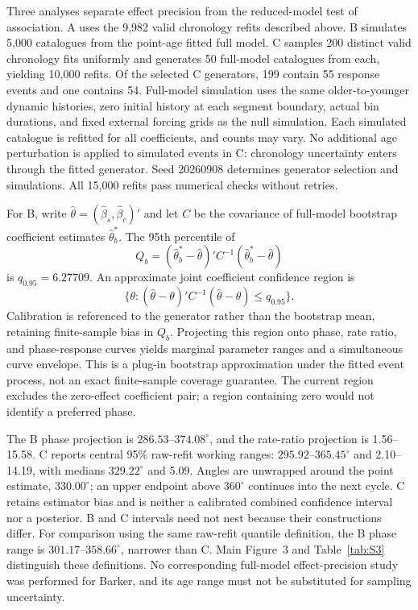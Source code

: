 \documentclass[11pt]{article}
\begin{document}
Three analyses separate effect precision from the reduced-model test of association. A uses the 9,982 valid chronology refits described above. B simulates 5,000 catalogues from the point-age fitted full model. C samples 200 distinct valid chronology fits uniformly and generates 50 full-model catalogues from each, yielding 10,000 refits. Of the selected C generators, 199 contain 55 response events and one contains 54. Full-model simulation uses the same older-to-younger dynamic histories, zero initial history at each segment boundary, actual bin durations, and fixed external forcing grids as the null simulation. Each simulated catalogue is refitted for all coefficients, and counts may vary. No additional age perturbation is applied to simulated events in C: chronology uncertainty enters through the fitted generator. Seed 20260908 determines generator selection and simulations. All 15,000 refits pass numerical checks without retries.

For B, write $\widehat\theta=(\widehat\beta_s,\widehat\beta_c)'$ and let $C$ be the covariance of full-model bootstrap coefficient estimates $\widehat\theta_b^*$. The 95th percentile of
\begin{equation}
 Q_b=(\widehat\theta_b^*-\widehat\theta)'C^{-1}(\widehat\theta_b^*-\widehat\theta)
\end{equation}
is $q_{0.95}=6.27709$. An approximate joint coefficient confidence region is
\begin{equation}
 \{\theta:(\widehat\theta-\theta)'C^{-1}(\widehat\theta-\theta)\leq q_{0.95}\}.
\end{equation}
Calibration is referenced to the generator rather than the bootstrap mean, retaining finite-sample bias in $Q_b$. Projecting this region onto phase, rate ratio, and phase-response curves yields marginal parameter ranges and a simultaneous curve envelope. This is a plug-in bootstrap approximation under the fitted event process, not an exact finite-sample coverage guarantee. The current region excludes the zero-effect coefficient pair; a region containing zero would not identify a preferred phase.

The B phase projection is $286.53$--$374.08^\circ$, and the rate-ratio projection is 1.56--15.58. C reports central 95\% raw-refit working ranges: $295.92$--$365.45^\circ$ and 2.10--14.19, with medians $329.22^\circ$ and 5.09. Angles are unwrapped around the point estimate, $330.00^\circ$; an upper endpoint above $360^\circ$ continues into the next cycle. C retains estimator bias and is neither a calibrated combined confidence interval nor a posterior. B and C intervals need not nest because their constructions differ. For comparison using the same raw-refit quantile definition, the B phase range is $301.17$--$358.66^\circ$, narrower than C. Main Figure~3 and Table~\ref{tab:S3} distinguish these definitions. No corresponding full-model effect-precision study was performed for Barker, and its age range must not be substituted for sampling uncertainty.
\end{document}

